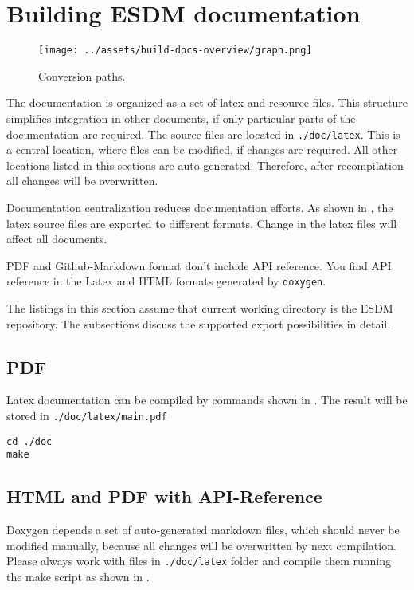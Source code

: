 \section{Building ESDM documentation}

\begin{figure}[!ht]
  \begin{center}
    \texttt{[image: ../assets/build-docs-overview/graph.png]}
  \end{center}
  \caption{Conversion paths.}
  \label{fig:build-docs-overview}
\end{figure}

The documentation is organized as a set of latex and resource files.
This structure simplifies integration in other documents, if only particular parts of the documentation are required.
The source files are located in \lstinline|./doc/latex|.
This is a central location, where files can be modified, if changes are required.
All other locations listed in this sections are auto-generated.
Therefore, after recompilation all changes will be overwritten.

Documentation centralization reduces documentation efforts.
As shown in , the latex source files are exported to different formats.
Change in the latex files will affect all documents.

PDF and Github-Markdown format don't include API reference.
You find API reference in the Latex and HTML formats generated by \lstinline|doxygen|.

The listings in this section assume that current working directory is the ESDM repository.
The subsections discuss the supported export possibilities in detail.

\subsection{PDF}
Latex documentation can be compiled by commands shown in .
The result will be stored in \lstinline|./doc/latex/main.pdf|

\begin{lstlisting}[caption={Make PDF document},label={code:doc:latex}]
cd ./doc
make
\end{lstlisting}


\subsection{HTML and PDF with API-Reference}
Doxygen depends a set of auto-generated markdown files, which should never be modified manually, because all changes will be overwritten by next compilation.
Please always work with files in \lstinline|./doc/latex| folder and compile them running the make script as shown in .

